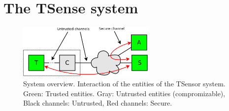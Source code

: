 \section{The TSense system}

\begin{figure}
\begin{center}
\includegraphics[width=0.6\textwidth]{figures/sys-overview.png} 
\end{center}
\caption{System overview. Interaction of the entities of the TSensor system. Green: Trusted entities. Gray: Untrusted entities (compromizable), Black channels: Untrusted, Red channels: Secure.}
\label{fig:sys-overview}
\end{figure}


